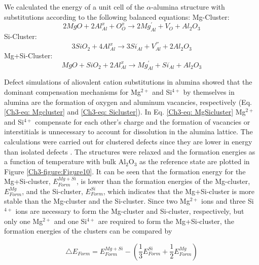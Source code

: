 We calculated the energy of a unit cell of the $\alpha$-alumina structure with substitutions according to the following balanced equations:\newline
\newline
\noindent Mg-Cluster: 
\begin{equation}
\label{Ch3-eq: Mgcluster}
2MgO + 2Al_{Al}^{x} + O_{O}^{x} \longrightarrow 2Mg_{Al}^{'} + V_{O}^{^{..}} + Al_{2}O_{3}
\end{equation}
\newline
\noindent Si-Cluster:
\begin{equation}
\label{Ch3-eq: Sicluster}
3SiO_{2} + 4Al_{Al}^{x} \longrightarrow 3Si_{Al}^{^{.}} + V_{Al}^{'''} + 2Al_{2}O_{3}
\end{equation}
\newline
\noindent Mg+Si-Cluster:
\begin{equation}
\label{Ch3-eq: MgSicluster}
MgO + SiO_{2} + 2Al_{Al}^{x} \longrightarrow Mg_{Al}^{'} + Si_{Al}^{^{.}} + Al_{2}O_{3}
\end{equation}


\noindent Defect simulations of aliovalent cation substitutions in alumina \cite{Atkinson2003} showed that the dominant compensation mechanisms for Mg$^{2+}$ and Si$^{4+}$ by themselves in alumina are the formation of oxygen and aluminum vacancies, respectively (Eq. \ref{Ch3-eq: Mgcluster} and \ref{Ch3-eq: Sicluster}). In Eq. \ref{Ch3-eq: MgSicluster} Mg$^{2+}$ and Si$^{4+}$ compensate for each other's charge and the formation of vacancies or interstitials is unnecessary to account for dissolution in the alumina lattice. The calculations were carried out for clustered defects since they are lower in energy than isolated defects \cite{Atkinson2003}. The structures were relaxed and the formation energies as a function of temperature with bulk Al$_{2}$O$_{3}$ as the reference state are plotted in Figure \ref{Ch3-figure:Figure10}. It can be seen that the formation energy for the Mg+Si-cluster, $E_{Form}^{Mg+Si}$, is lower than the formation energies of the Mg-cluster, $E_{Form}^{Mg}$, and the Si-cluster, $E_{Form}^{Si}$, which indicates that the Mg+Si-cluster is more stable than the Mg-cluster and the Si-cluster. Since two Mg$^{2+}$ ions and three Si$^{4+}$ ions are necessary to form the Mg-cluster and Si-cluster, respectively, but only one Mg$^{2+}$ and one Si$^{4+}$ are required to form the Mg+Si-cluster, the formation energies of the clusters can be compared by 

\begin{equation}
\label{Ch3-eq: eform}
\bigtriangleup E_{Form}=E_{Form}^{Mg+Si} - \left( \frac{1}{3} E_{Form}^{Si} + \frac{1}{2}E_{Form}^{Mg} \right)
\end{equation}

